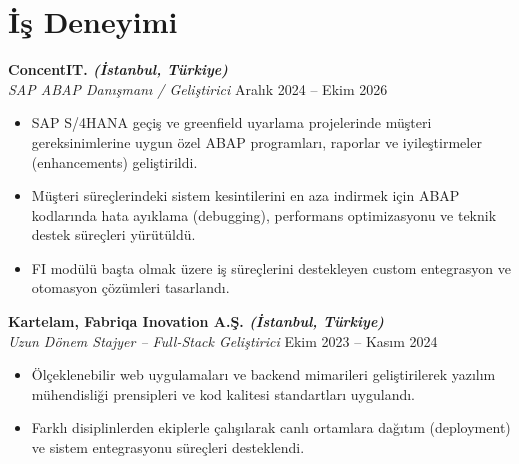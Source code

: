 \documentclass[10pt,a4paper]{extarticle}
\begin{document}
\section{İş Deneyimi}
\textbf{ConcentIT. \textit{(İstanbul, Türkiye)}}\\
\textit{SAP ABAP Danışmanı / Geliştirici} \hfill Aralık 2024 -- Ekim 2026
\begin{itemize}[leftmargin=*,noitemsep,topsep=0pt]
    \item SAP S/4HANA geçiş ve greenfield uyarlama projelerinde müşteri gereksinimlerine uygun özel ABAP programları, raporlar ve iyileştirmeler (enhancements) geliştirildi.
    \item Müşteri süreçlerindeki sistem kesintilerini en aza indirmek için ABAP kodlarında hata ayıklama (debugging), performans optimizasyonu ve teknik destek süreçleri yürütüldü.
    \item FI modülü başta olmak üzere iş süreçlerini destekleyen custom entegrasyon ve otomasyon çözümleri tasarlandı.
\end{itemize}
\textbf{Kartelam, Fabriqa Inovation A.Ş. \textit{(İstanbul, Türkiye)}}\\
\textit{Uzun Dönem Stajyer -- Full-Stack Geliştirici} \hfill Ekim 2023 -- Kasım 2024
\begin{itemize}[leftmargin=*,noitemsep,topsep=0pt]
    \item Ölçeklenebilir web uygulamaları ve backend mimarileri geliştirilerek yazılım mühendisliği prensipleri ve kod kalitesi standartları uygulandı.
    \item Farklı disiplinlerden ekiplerle çalışılarak canlı ortamlara dağıtım (deployment) ve sistem entegrasyonu süreçleri desteklendi.
\end{itemize}
\end{document}
